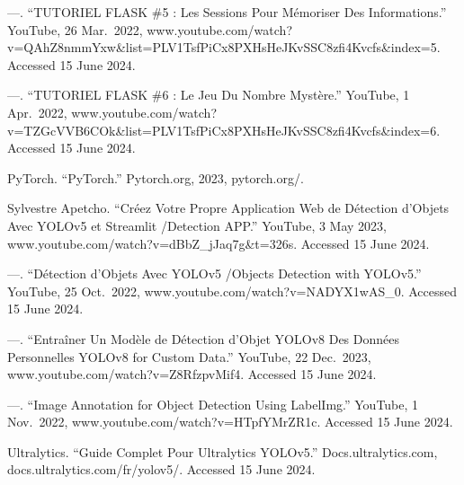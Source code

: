 \documentclass[
  10pt,
]{article}
\begin{document}
---. ``TUTORIEL FLASK \#5 : Les Sessions Pour Mémoriser Des
Informations.'' YouTube, 26 Mar.~2022,
www.youtube.com/watch?v=QAhZ8nmmYxw\&list=PLV1TsfPiCx8PXHsHeJKvSSC8zfi4Kvcfs\&index=5.
Accessed 15 June 2024.

---. ``TUTORIEL FLASK \#6 : Le Jeu Du Nombre Mystère.'' YouTube, 1
Apr.~2022,
www.youtube.com/watch?v=TZGcVVB6COk\&list=PLV1TsfPiCx8PXHsHeJKvSSC8zfi4Kvcfs\&index=6.
Accessed 15 June 2024.

PyTorch. ``PyTorch.'' Pytorch.org, 2023, pytorch.org/.

Sylvestre Apetcho. ``Créez Votre Propre Application Web de Détection
d'Objets Avec YOLOv5 et Streamlit /Detection APP.'' YouTube, 3 May 2023,
www.youtube.com/watch?v=dBbZ\_jJaq7g\&t=326s. Accessed 15 June 2024.

---. ``Détection d'Objets Avec YOLOv5 /Objects Detection with YOLOv5.''
YouTube, 25 Oct.~2022, www.youtube.com/watch?v=NADYX1wAS\_0. Accessed 15
June 2024.

---. ``Entraîner Un Modèle de Détection d'Objet \textbar{} YOLOv8 Des
Données Personnelles YOLOv8 for Custom Data.'' YouTube, 22 Dec.~2023,
www.youtube.com/watch?v=Z8RfzpvMif4. Accessed 15 June 2024.

---. ``Image Annotation for Object Detection Using LabelImg.'' YouTube,
1 Nov.~2022, www.youtube.com/watch?v=HTpfYMrZR1c. Accessed 15 June 2024.

Ultralytics. ``Guide Complet Pour Ultralytics YOLOv5.''
Docs.ultralytics.com, docs.ultralytics.com/fr/yolov5/. Accessed 15 June
2024.
\end{document}
